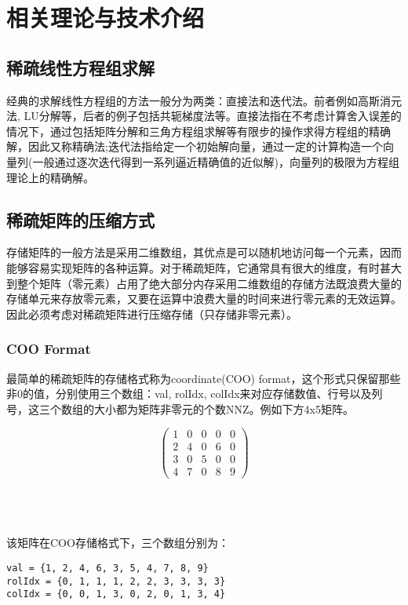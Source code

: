 \chapter{相关理论与技术介绍}

\section{稀疏线性方程组求解}

经典的求解线性方程组的方法一般分为两类：直接法和迭代法。前者例如高斯消元法, LU分解等，后者的例子包括共轭梯度法等。直接法指在不考虑计算舍入误差的情况下，通过包括矩阵分解和三角方程组求解等有限步的操作求得方程组的精确解，因此又称精确法;迭代法指给定一个初始解向量，通过一定的计算构造一个向量列(一般通过逐次迭代得到一系列逼近精确值的近似解)，向量列的极限为方程组理论上的精确解。

\section{稀疏矩阵的压缩方式}

存储矩阵的一般方法是采用二维数组，其优点是可以随机地访问每一个元素，因而能够容易实现矩阵的各种运算。对于稀疏矩阵，它通常具有很大的维度，有时甚大到整个矩阵（零元素）占用了绝大部分内存采用二维数组的存储方法既浪费大量的存储单元来存放零元素，又要在运算中浪费大量的时间来进行零元素的无效运算。因此必须考虑对稀疏矩阵进行压缩存储（只存储非零元素）。

\subsection{COO Format}

最简单的稀疏矩阵的存储格式称为coordinate(COO) format，这个形式只保留那些非0的值，分别使用三个数组：val, rolIdx, colIdx来对应存储数值、行号以及列号，这三个数组的大小都为矩阵非零元的个数NNZ。例如下方4x5矩阵。


$$
\begin{pmatrix}
    \label{稀疏矩阵例子}
    1 & 0 & 0 & 0 & 0 \\
    2 & 4 & 0 & 6 & 0 \\
    3 & 0 & 5 & 0 & 0 \\
    4 & 7 & 0 & 8 & 9
\end{pmatrix}
$$

~\\
~\\
~\\

该矩阵在COO存储格式下，三个数组分别为：
\begin{lstlisting}[title=COO Format]
val = {1, 2, 4, 6, 3, 5, 4, 7, 8, 9}
rolIdx = {0, 1, 1, 1, 2, 2, 3, 3, 3, 3}
colIdx = {0, 0, 1, 3, 0, 2, 0, 1, 3, 4}
\end{lstlisting}

